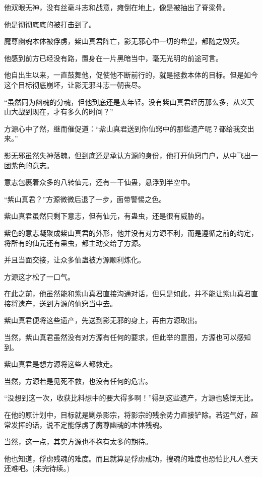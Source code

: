 \begin{this_body}
他双眼无神，没有丝毫斗志和战意，瘫倒在地上，像是被抽出了脊梁骨。

他是彻彻底底的被打击到了。

魔尊幽魂本体被俘虏，紫山真君阵亡，影无邪心中一切的希望，都随之毁灭。

他感到前方已经没有路，置身在一片黑暗当中，毫无光明的前途可言。

他自出生以来，一直鼓舞他，促使他不断前行的，就是拯救本体的目标。但是如今这个目标彻底崩坏，让影无邪斗志一朝丧尽。

“虽然同为幽魂的分魂，但他到底还是太年轻。没有紫山真君经历那么多，从义天山大战到现在，才有多久的时间？”

方源心中了然，继而催促道：“紫山真君送到你仙窍中的那些遗产呢？都给我交出来。”

影无邪虽然失神落魄，但到底还是承认方源的身份，他打开仙窍门户，从中飞出一团紫色的意志。

意志包裹着众多的八转仙元，还有一干仙蛊，悬浮到半空中。

“紫山真君？”方源微微后退了一步，面带警惕之色。

紫山真君虽然只剩下意志，但有仙元，有蛊虫，还是很有威胁的。

紫色的意志凝聚成紫山真君的外形，他并没有对方源不利，而是遵循之前的约定，将所有的仙元还有蛊虫，都主动交给了方源。

并且当面交接，让众多仙蛊被方源顺利炼化。

方源这才松了一口气。

在此之前，他虽然能和紫山真君直接沟通对话，但只是如此，并不能让紫山真君直接将遗产，送到方源的仙窍当中去。

紫山真君便将这些遗产，先送到影无邪的身上，再由方源取出。

当然，紫山真君虽然没有对方源有任何的要求，但此举的意图，方源也可以感知到。

紫山真君是想方源将这些人都救走。

当然，方源若是见死不救，也没有任何的危害。

“没想到这一次，收获比料想中的要大得多啊！”得到这些遗产，方源也感慨无比。

在他的原计划中，目标就是剿杀影宗，将影宗的残余势力直接铲除。若运气好，超常发挥的话，说不定能俘虏了魔尊幽魂的本体残魂。

当然，这一点，其实方源也不抱有太多的期待。

他也知道，俘虏残魂的难度。而且就算是俘虏成功，搜魂的难度也恐怕比凡人登天还难吧。(未完待续。)

\end{this_body}

